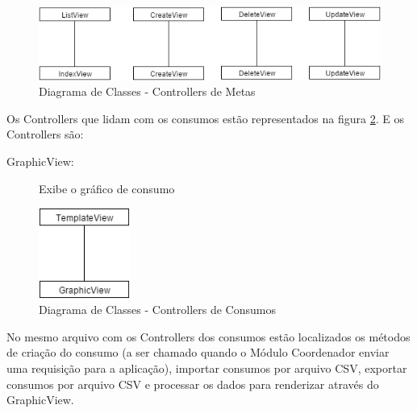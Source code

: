 \begin{figure}[H]
\centering
\includegraphics[width=14cm,keepaspectratio]{figuras/diagrama_cont_goal.png}
\caption{\label{fig:diagrama-cont-goal} Diagrama de Classes - Controllers de Metas}
\end{figure}

Os Controllers que lidam com os consumos estão representados na figura \ref{fig:diagrama-cont-consumption}. E os Controllers são:
\begin{description}
	\item[GraphicView:] Exibe o gráfico de consumo
\end{description} 

\begin{figure}[H]
\centering
\includegraphics[width=3cm,keepaspectratio]{figuras/diagrama_cont_consumption.png}
\caption{\label{fig:diagrama-cont-consumption} Diagrama de Classes - Controllers de Consumos}
\end{figure}

No mesmo arquivo com os Controllers dos consumos estão localizados os métodos de criação do consumo (a ser chamado quando o Módulo Coordenador enviar uma requisição para a aplicação), importar consumos por arquivo CSV, exportar consumos por arquivo CSV e processar os dados para renderizar através do GraphicView.